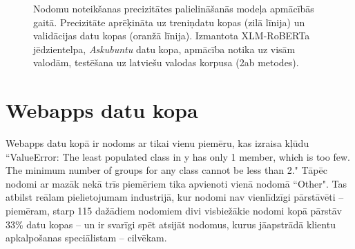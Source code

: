 \begin{figure}[h] 
   \centering
   \caption{Nodomu noteikšanas precizitātes palielināšanās modeļa apmācībās gaitā. Precizitāte aprēķināta uz treniņdatu kopas (zilā līnija) un validācijas datu kopas (oranžā līnija). Izmantota XLM-RoBERTa jēdzientelpa, \textit{Askubuntu} datu kopa, apmācība notika uz visām valodām, testēšana uz latviešu valodas korpusa (2ab metodes).} 
   \label{fig:askubuntu-xlm-all}
\end{figure}



\section{Webapps datu kopa}


Webapps datu kopā ir nodoms ar tikai vienu piemēru, kas izraisa kļūdu “ValueError: The least populated class in y has only 1 member, which is too few. The minimum number of groups for any class cannot be less than 2." Tāpēc nodomi ar mazāk nekā trīs piemēriem tika apvienoti vienā nodomā “Other". Tas atbilst reālam pielietojumam industrijā, kur nodomi nav vienlīdzīgi pārstāvēti  -- piemēram, starp 115 dažādiem nodomiem divi visbiežākie nodomi kopā pārstāv 33\% datu kopas \cite{paikens2020} -- un ir svarīgi spēt atsijāt nodomus, kurus jāapstrādā klientu apkalpošanas speciālistam -- cilvēkam.

